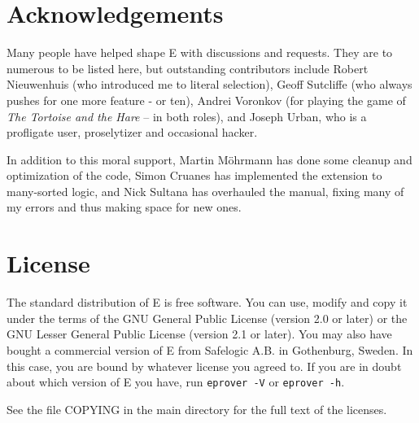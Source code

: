 \documentclass{report}
\begin{document}
\clearpage
\begin{appendix}
  \chapter{Acknowledgements}

  Many people have helped shape E with discussions and requests. They
  are to numerous to be listed here, but outstanding contributors
  include Robert Nieuwenhuis (who introduced me to literal selection),
  Geoff Sutcliffe (who always pushes for one more feature - or ten),
  Andrei Voronkov (for playing the game of \emph{The Tortoise and the
    Hare} -- in both roles), and Joseph Urban, who is a profligate
  user, proselytizer and occasional hacker.

  In addition to this moral support, Martin M\"ohrmann has done some
  cleanup and optimization of the code, Simon Cruanes has implemented
  the extension to many-sorted logic, and Nick Sultana has overhauled
  the manual, fixing many of my errors and thus making space for new
  ones.

  \chapter{License}

  The standard distribution of E is free software. You can use, modify
  and copy it under the terms of the GNU General Public License
  (version 2.0 or later) or the GNU Lesser General Public License
  (version 2.1 or later). You may also have bought a commercial
  version of E from Safelogic A.B. in Gothenburg, Sweden. In this
  case, you are bound by whatever license you agreed to. If you are in
  doubt about which version of E you have, run \texttt{eprover -V} or
  \texttt{eprover -h}.

  See the file COPYING in the main directory for the full text of the
  licenses.
\end{appendix}
\end{document}

